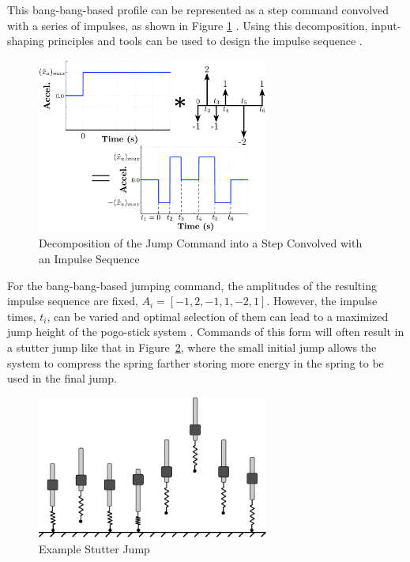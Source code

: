 \documentclass[twocolumn,10pt]{asme2e}
\begin{document}
This bang-bang-based profile can be represented as a step command convolved with a series of impulses, as shown in Figure \ref{fig:jump_convolve} \cite{Sorensen:08d}. Using this decomposition, input-shaping principles and tools can be used to design the impulse sequence \cite{Singer:90, Singhose:94a}. 
%
\begin{figure}[tbp]
\begin{center}
\includegraphics[width = 3.0in]{figures/jump_convolve}
\caption{Decomposition of the Jump Command into a Step Convolved with an Impulse Sequence}
\label{fig:jump_convolve}
\end{center}
\vspace{-0.2in}
\end{figure}
%
For the bang-bang-based jumping command, the amplitudes of the resulting impulse sequence are fixed, $A_i = [-1, 2, -1, 1, -2, 1]$. However, the impulse times, $t_i$, can be varied and optimal selection of them can lead to a maximized jump height of the pogo-stick system \cite{Vaughan2013}. Commands of this form will often result in a stutter jump like that in Figure~\ref{fig:stutterJumpFigure}, where the small initial jump allows the system to compress the spring farther storing more energy in the spring to be used in the final jump.
%
\begin{figure}[t]
	\begin{center}
		\includegraphics[width=3in]{figures/stutter_jump.pdf}
	\end{center}
	\caption{Example Stutter Jump}
	\label{fig:stutterJumpFigure} 
\end{figure}
\end{document}
